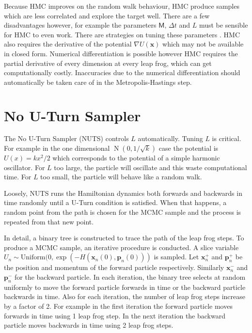 \documentclass[10pt]{proc}
\DeclareMathOperator{\normal}{N}
\newcommand{\vect}[1]{\mathbf{#1}}
\newcommand{\matr}[1]{\mathsf{#1}}
\begin{document}
Because HMC improves on the random walk behaviour, HMC produce samples which are less correlated and explore the target well. There are a few disadvantages however, for example the parameters $\matr{M}$, $\Delta t$ and $L$ must be sensible for HMC to even work. There are strategies on tuning these parameters \citep{neal2011mcmc}. HMC also requires the derivative of the potential $\nabla U(\vect{x})$ which may not be available in closed form. Numerical differentiation is possible however HMC requires the partial derivative of every dimension at every leap frog, which can get computationally costly. Inaccuracies due to the numerical differentiation should automatically be taken care of in the Metropolis-Hastings step.

\section{No U-Turn Sampler}

The No U-Turn Sampler (NUTS) \citep{hoffman2014no} controls $L$ automatically. Tuning $L$ is critical. For example in the one dimensional $\normal(0,1/\sqrt{k})$ case the potential is $U(x)=kx^2/2$ which corresponds to the potential of a simple harmonic oscillator. For $L$ too large, the particle will oscillate and this waste computational time. For $L$ too small, the particle will behave like a random walk.

Loosely, NUTS runs the Hamiltonian dynamics both forwards and backwards in time randomly until a U-Turn condition is satisfied. When that happens, a random point from the path is chosen for the MCMC sample and the process is repeated from that new point.

In detail, a binary tree is constructed to trace the path of the leap frog steps. To produce a MCMC sample, an iterative procedure is conducted. A slice variable $U_n\sim\text{Uniform}(0,\exp(-H(\vect{x}_n(0),\vect{p}_n(0)))$ is sampled. Let $\vect{x}_n^+$ and $\vect{p}_n^+$ be the position and momentum of the forward particle respectively. Similarly $\vect{x}_n^-$ and $\vect{p}_n^-$ for the backward particle. In each iteration, the binary tree selects at random uniformly to move the forward particle forwards in time or the backward particle backwards in time. Also for each iteration, the number of leap frog steps increase by a factor of 2. For example in the first iteration the forward particle moves forwards in time using 1 leap frog step. In the next iteration the backward particle moves backwards in time using 2 leap frog steps.
\end{document}
